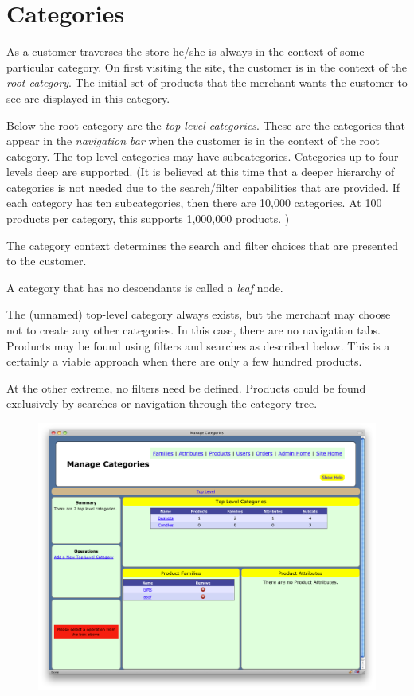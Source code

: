 \documentclass[letterpaper, 12pt]{article}
\begin{document}
\section{Categories}
As a customer traverses the store he/she is always in the context of some particular category.  On first visiting the site, the customer is in the context of the {\em root category}.   The initial set of products that the merchant wants the customer to see are displayed in this category.

Below the root category are the {\em top-level categories}.  These are the categories that appear in the {\em navigation bar} when the customer is in the context of the root category.  The top-level categories may have subcategories.  Categories up to four levels deep are supported.  (It is believed at this time that a deeper hierarchy of categories is not needed due to the search/filter capabilities that are provided.  If each category has ten subcategories, then there are 10,000 categories.  At 100 products per category, this supports 1,000,000 products. )

The category context determines the search and filter choices that are presented to the customer.

A category that has no descendants is called a {\em leaf} node.

The (unnamed) top-level category always exists, but the merchant may choose not to create any other categories.  In this case, there are no navigation tabs.  Products may be found using filters and searches as described below.  This is a certainly a viable approach when there are only a few hundred products.

At the other extreme, no filters need be defined.  Products could be found exclusively by searches or navigation through the category tree.

\begin{figure}
\includegraphics[scale=0.4]{categories-show}
\end{figure}
\end{document}
